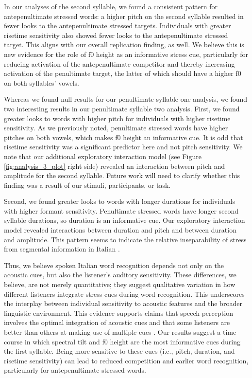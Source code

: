 In our analyses of the second syllable, we found a consistent pattern for antepenultimate stressed words: a higher pitch on the second syllable resulted in fewer looks to the antepenultimate stressed targets. Individuals with greater risetime sensitivity also showed fewer looks to the antepenultimate stressed target. This aligns with our overall replication finding, as well. We believe this is new evidence for the role of f0 height as an informative stress cue, particularly for reducing activation of the antepenultimate competitor and thereby increasing activation of the penultimate target, the latter of which should have a higher f0 on both syllables' vowels.

Whereas we found null results for our penultimate syllable one analysis, we found two interesting results in our penultimate syllable two analysis. First, we found greater looks to words with higher pitch for individuals with higher risetime sensitivity. As we previously noted, penultimate stressed words have higher pitches on both vowels, which makes f0 height an informative cue. It is odd that risetime sensitivity was a significant predictor here and not pitch sensitivity. We note that our additional exploratory interaction model (see Figure \ref{fig:analysis_3_plot} right side) revealed an interaction between pitch and amplitude for the second syllable. Future work will need to clarify whether this finding was a result of our stimuli, participants, or task. 

Second, we found greater looks to words with longer durations for individuals with higher formant sensitivity. Penultimate stressed words have longer second syllable durations, so duration is an informative cue. Our exploratory interaction model revealed interactions between duration and pitch and between duration and amplitude. This pattern seems to indicate the relative inseparability of stress from segmental information in Italian \citep{Tagliapietra2005, Tagliapietra2010}.

Thus, we believe spoken Italian word recognition depends not only on the acoustic cues, but also the listener's auditory sensitivity. These differences, we believe, are not merely quantitative; they suggest qualitative variation in how different listeners integrate stress cues during word recognition. This underscores the interplay between individual sensitivity to acoustic features and the broader linguistic environment. This evidence supports claims that speech perception involves the optimal integration of acoustic cues \citep{clayards2008} and that some listeners are better than others at making use of multiple cues \citep{clayards2018}. Our results suggest a time-course in which spectral tilt and f0 height are the most informative cues during the first syllable. Being more sensitive to these cues (i.e., pitch, duration, and risetime sensitivity) can lead to reduced competition and earlier word recognition, particularly for antepenultimate stressed words.

